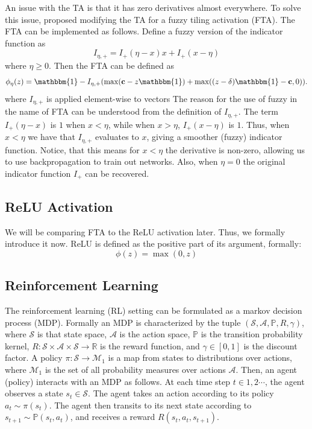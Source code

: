 \documentclass{article}
\newcommand{\RR}{\mathbb{R}}
\newcommand{\PP}{\mathbb{P}}
\newcommand{\cS}{\mathcal{S}}
\newcommand{\cA}{\mathcal{A}}
\newcommand{\cM}{\mathcal{M}}
\begin{document}
An issue with the TA is that it has zero derivatives almost everywhere.
To solve this issue, \cite{pan2019fuzzy} proposed modifying the TA for a fuzzy tiling activation (FTA).
The FTA can be implemented as follows.
Define a fuzzy version of the indicator function as
$$I_{\eta, +} = I_+(\eta -x)x + I_+(x - \eta)$$
where $\eta \ge 0$.
Then the FTA can be defined as
$$\phi_\eta(z) = \mathbbm{1} - I_{\eta, +} (\max(\mathbf{c} - z \mathbbm{1}) + \max((z-\delta)\mathbbm{1} - \mathbf{c}, 0)).$$
where $I_{\eta, +}$ is applied element-wise to vectors
The reason for the use of fuzzy in the name of FTA can be understood from the definition of $I_{\eta, +}$.
The term $I_+(\eta -x)$ is $1$ when $x < \eta$, while when $x > \eta$, $I_+(x - \eta)$ is $1$.
Thus, when $x < \eta$ we have that $I_{\eta ,+}$ evaluates to $x$, giving a smoother (fuzzy) indicator function.
Notice, that this means for $x < \eta$ the derivative is non-zero, allowing us to use backpropagation to train out networks.
Also, when $\eta = 0$ the original indicator function $I_+$ can be recovered.

\subsection{ReLU Activation}
We will be comparing FTA to the ReLU activation later.
Thus, we formally introduce it now.
ReLU is defined as the positive part of its argument, formally:
$$\phi(z) = \max(0, z)$$

\subsection{Reinforcement Learning} \label{sub-sec:reinforcement}
The reinforcement learning (RL) setting can be formulated as a markov decision process (MDP).
Formally an MDP is characterized by the tuple $(\cS, \cA, \PP, R, \gamma)$, where $\cS$ is that state space, $\cA$ is the action space,
$\PP$ is the transition probability kernel, $R: \cS \times \cA \times \cS \to \RR$ is the reward function, and $\gamma \in [0, 1]$ is the discount factor.
A policy $\pi: \cS \to \cM_1$ is a map from states to distributions over actions, where $\cM_1$ is the set of all probability measures over actions $\cA$.
Then, an agent (policy) interacts with an MDP as follows.
At each time step $t \in 1, 2 \cdots$, the agent observes a state $s_t \in \cS$.
The agent takes an action according to its policy $a_t \sim \pi(s_t)$.
The agent then transits to its next state according to $s_{t+1} \sim \PP(s_t, a_t)$, and receives a reward $R(s_t, a_t, s_{t+1})$.
\end{document}
